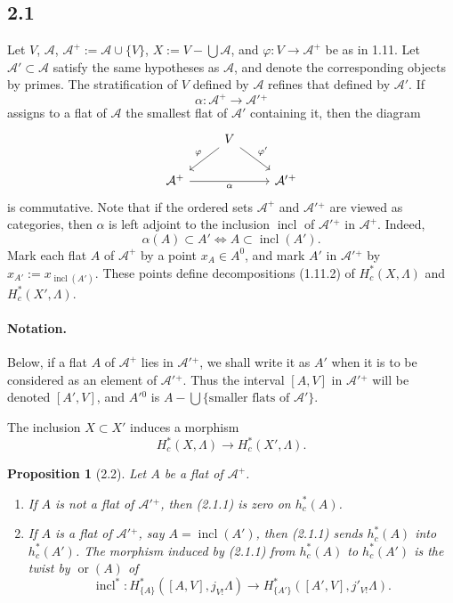 \documentclass[11pt]{article}
\newtheorem{proposition}[theorem]{Proposition}
\theoremstyle{definition}
\newcommand{\ornt}{\operatorname{or}}
\newcommand{\incl}{\operatorname{incl}}
\begin{document}
\subsection*{2.1}
Let $V$, $\mathcal A$, $\mathcal A^+:=\mathcal A\cup\{V\}$, $X:=V-\bigcup\mathcal A$, and $\varphi:V\to\mathcal A^+$ be as in 1.11.  Let $\mathcal A'\subset\mathcal A$ satisfy the same hypotheses as $\mathcal A$, and denote the corresponding objects by primes.  The stratification of $V$ defined by $\mathcal A$ refines that defined by $\mathcal A'$.  If
\[
\alpha:\mathcal A^+\longrightarrow \mathcal A'{}^+
\]
assigns to a flat of $\mathcal A$ the smallest flat of $\mathcal A'$ containing it, then the diagram
\[
\begin{tikzcd}
& V \arrow[dl,"\varphi"'] \arrow[dr,"\varphi'"] & \\
\mathcal A^+ \arrow[rr,"\alpha"'] && \mathcal A'{}^+
\end{tikzcd}
\]
is commutative.  Note that if the ordered sets $\mathcal A^+$ and $\mathcal A'{}^+$ are viewed as categories, then $\alpha$ is left adjoint to the inclusion $\incl$ of $\mathcal A'{}^+$ in $\mathcal A^+$.  Indeed,
\[
\alpha(A)\subset A'\Longleftrightarrow A\subset\incl(A').
\]
Mark each flat $A$ of $\mathcal A^+$ by a point $x_A\in A^0$, and mark $A'$ in $\mathcal A'{}^+$ by $x_{A'}:=x_{\incl(A')}$.  These points define decompositions (1.11.2) of $H_c^*(X,\Lambda)$ and $H_c^*(X',\Lambda)$.

\paragraph{Notation.} Below, if a flat $A$ of $\mathcal A^+$ lies in $\mathcal A'{}^+$, we shall write it as $A'$ when it is to be considered as an element of $\mathcal A'{}^+$.  Thus the interval $[A,V]$ in $\mathcal A'{}^+$ will be denoted $[A',V]$, and $A'{}^0$ is $A-\bigcup\{\text{smaller flats of }\mathcal A'\}$.

The inclusion $X\subset X'$ induces a morphism
\begin{equation}
H_c^*(X,\Lambda)\longrightarrow H_c^*(X',\Lambda).\tag{2.1.1}
\end{equation}

\begin{proposition}[2.2]
Let $A$ be a flat of $\mathcal A^+$.
\begin{enumerate}[label=(\roman*)]
\item If $A$ is not a flat of $\mathcal A'{}^+$, then (2.1.1) is zero on $h_c^*(A)$.
\item If $A$ is a flat of $\mathcal A'{}^+$, say $A=\incl(A')$, then (2.1.1) sends $h_c^*(A)$ into $h_c^*(A')$.  The morphism induced by (2.1.1) from $h_c^*(A)$ to $h_c^*(A')$ is the twist by $\ornt(A)$ of
\begin{equation}
\incl^*:H^*_{\{A\}}([A,V],j_{V!}\Lambda)\longrightarrow H^*_{\{A'\}}([A',V],j'_{V!}\Lambda).\tag{2.2.1}
\end{equation}
\end{enumerate}
\end{proposition}
\end{document}
